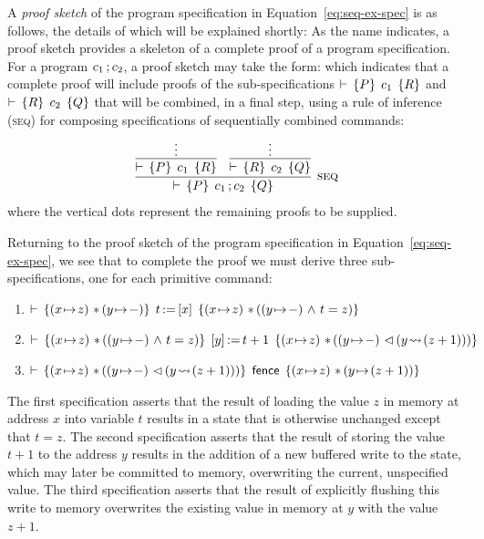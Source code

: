 \documentclass[11pt]{report}
\begin{document}
A \emph{proof sketch} of the program specification in Equation~\ref{eq:seq-ex-spec} is as follows, the details of which will be explained shortly:
As the name indicates, a proof sketch provides a skeleton of a complete proof of a program specification. For a program $c_1 \operatorname{;} c_2$, a proof sketch may take the form: 
 which indicates that a complete proof will include proofs of the sub-specifications $\vdash\,\left\lbrace P \right\rbrace\;c_1\;\left\lbrace R \right\rbrace$ and $\vdash\,\left\lbrace R \right\rbrace\;c_2\;\left\lbrace Q \right\rbrace$ that will be combined, in a final step, using a rule of inference (\textsc{seq}) for composing specifications of sequentially combined commands: 
\[ \infer[{\textsc{seq}}]{\triple{P}{c_1 \opseq c_2}{Q}}{\infer{\triple{P}{c_1}{R}}{\vdots} & \infer{\triple{R}{c_2}{Q}}{\vdots}}\] where the vertical dots represent the remaining proofs to be supplied. 

Returning to the proof sketch of the program specification in Equation~\ref{eq:seq-ex-spec}, we see that to complete the proof we must derive three sub-specifications, one for each primitive command: \begin{enumerate}
  \item $\triple{(x \fpointsto z) \fsep (y \fpointsto -)}{\cload{t}{x}}{(x \fpointsto z) \fsep ((y \fpointsto -) \conj t = z)}$
  \item $\triple{(x \fpointsto z) \fsep ((y \fpointsto -) \conj t = z)}{\cstore{y}{t+1}}{(x \fpointsto z) \fsep ((y \fpointsto -) \fseq (y \fwriteu (z+1)))}$
  \item $\triple{(x \fpointsto z) \fsep ((y \fpointsto -) \fseq (y \fwriteu (z+1)))}{\cfence}{(x \fpointsto z) \fsep (y \fpointsto (z+1))}$
\end{enumerate}
The first specification asserts that the result of loading the value $z$ in memory at address $x$ into variable $t$ results in a state that is otherwise unchanged except that $t = z$. The second specification asserts that the result of storing the value $t+1$ to the address $y$ results in the addition of a new buffered write to the state, which may later be committed to memory, overwriting the current, unspecified value. The third specification asserts that the result of explicitly flushing this write to memory overwrites the existing value in memory at $y$ with the value $z+1$. 
\end{document}
